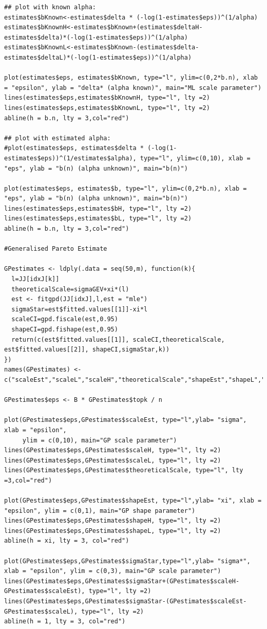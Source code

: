 \documentclass[honours,12pt]{unswthesis}
\newcommand{\1}{\mathbf 1}
\numberwithin{equation}{section}
\theoremstyle{definition}
\theoremstyle{remark}
\begin{document}
\begin{appendices}
\begin{lstlisting}
## plot with known alpha:
estimates$bKnown<-estimates$delta * (-log(1-estimates$eps))^(1/alpha)
estimates$bKnownH<-estimates$bKnown+(estimates$deltaH-estimates$delta)*(-log(1-estimates$eps))^(1/alpha)
estimates$bKnownL<-estimates$bKnown-(estimates$delta-estimates$deltaL)*(-log(1-estimates$eps))^(1/alpha)

plot(estimates$eps, estimates$bKnown, type="l", ylim=c(0,2*b.n), xlab = "epsilon", ylab = "delta* (alpha known)", main="ML scale parameter")
lines(estimates$eps,estimates$bKnownH, type="l", lty =2)
lines(estimates$eps,estimates$bKnownL, type="l", lty =2)
abline(h = b.n, lty = 3,col="red")

## plot with estimated alpha:
#plot(estimates$eps, estimates$delta * (-log(1-estimates$eps))^(1/estimates$alpha), type="l", ylim=c(0,10), xlab = "eps", ylab = "b(n) (alpha unknown)", main="b(n)")

plot(estimates$eps, estimates$b, type="l", ylim=c(0,2*b.n), xlab = "eps", ylab = "b(n) (alpha unknown)", main="b(n)")
lines(estimates$eps,estimates$bH, type="l", lty =2)
lines(estimates$eps,estimates$bL, type="l", lty =2)
abline(h = b.n, lty = 3,col="red")

#Generalised Pareto Estimate

GPestimates <- ldply(.data = seq(50,m), function(k){
  l=JJ[idxJ[k]]
  theoreticalScale=sigmaGEV+xi*(l)
  est <- fitgpd(JJ[idxJ],l,est = "mle")
  sigmaStar=est$fitted.values[[1]]-xi*l
  scaleCI=gpd.fiscale(est,0.95)
  shapeCI=gpd.fishape(est,0.95)
  return(c(est$fitted.values[[1]], scaleCI,theoreticalScale, est$fitted.values[[2]], shapeCI,sigmaStar,k))
})
names(GPestimates) <- c("scaleEst","scaleL","scaleH","theoreticalScale","shapeEst","shapeL","shapeH","sigmaStar","topk")

GPestimates$eps <- B * GPestimates$topk / n

plot(GPestimates$eps,GPestimates$scaleEst, type="l",ylab= "sigma", xlab = "epsilon", 
     ylim = c(0,10), main="GP scale parameter")
lines(GPestimates$eps,GPestimates$scaleH, type="l", lty =2)
lines(GPestimates$eps,GPestimates$scaleL, type="l", lty =2)
lines(GPestimates$eps,GPestimates$theoreticalScale, type="l", lty =3,col="red")

plot(GPestimates$eps,GPestimates$shapeEst, type="l",ylab= "xi", xlab = "epsilon", ylim = c(0,1), main="GP shape parameter")
lines(GPestimates$eps,GPestimates$shapeH, type="l", lty =2)
lines(GPestimates$eps,GPestimates$shapeL, type="l", lty =2)
abline(h = xi, lty = 3, col="red")

plot(GPestimates$eps,GPestimates$sigmaStar,type="l",ylab= "sigma*", xlab = "epsilon", ylim = c(0,3), main="GP scale parameter")
lines(GPestimates$eps,GPestimates$sigmaStar+(GPestimates$scaleH-GPestimates$scaleEst), type="l", lty =2)
lines(GPestimates$eps,GPestimates$sigmaStar-(GPestimates$scaleEst-GPestimates$scaleL), type="l", lty =2)
abline(h = 1, lty = 3, col="red")
\end{lstlisting}

\end{appendices}
\end{document}
